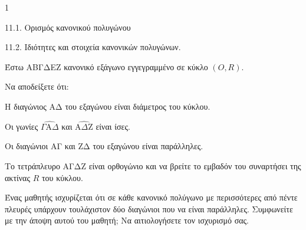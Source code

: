\begin{ylh}{1}
    \item 11.1. Ορισμός κανονικού πολυγώνου
    \item 11.2. Ιδιότητες και στοιχεία κανονικών πολυγώνων.
\end{ylh}
\begin{figure}
    \centering
\end{figure}
\noindent Έστω ΑΒΓΔΕΖ κανονικό εξάγωνο εγγεγραμμένο σε κύκλο $(O,R)$.
\begin{alist}
    \item Να αποδείξετε ότι:
    \begin{rlist}
        \item Η διαγώνιος ΑΔ του εξαγώνου είναι διάμετρος του κύκλου. 
        \item Οι γωνίες $\widehat{\Gamma\mathrm{A}\Delta}$ και $\widehat{\mathrm{A}\Delta\mathrm{Z}}$ είναι ίσες. 
        \item Οι διαγώνιοι ΑΓ και ΖΔ του εξαγώνου είναι παράλληλες. 
        \item Το τετράπλευρο ΑΓΔΖ είναι ορθογώνιο και να βρείτε το εμβαδόν του συναρτήσει της ακτίνας $R$ του κύκλου. 
    \end{rlist}
    \item Ένας μαθητής ισχυρίζεται ότι σε κάθε κανονικό πολύγωνο με περισσότερες από πέντε πλευρές υπάρχουν τουλάχιστον δύο διαγώνιοι που να είναι παράλληλες. Συμφωνείτε με την άποψη αυτού του μαθητή; Να αιτιολογήσετε τον ισχυρισμό σας. 
\end{alist}
